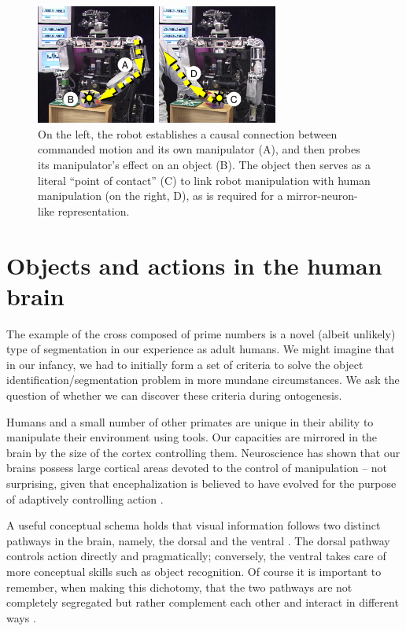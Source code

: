 %
\begin{figure}[tbh]
\begin{center}
\includegraphics[width=8cm]{tracing_causes.eps}
\caption{ 
\label{fig:tracing-causes}
%
On the left, the robot establishes a causal connection between
commanded motion and its own manipulator (A), and then probes its
manipulator's effect on an object (B).  The object then serves as a
literal ``point of contact'' (C) to link robot manipulation with human
manipulation (on the right, D), as is required for a mirror-neuron-like
representation.
%
}
\end{center}
\end{figure}
%

\section{Objects and actions in the human brain}

The example of the cross composed of prime numbers is a novel (albeit
unlikely) type of segmentation in our experience as adult humans. We
might imagine that in our infancy, we had to initially form a set of
criteria to solve the object identification/segmentation problem
in more mundane circumstances.  We ask the question of whether we can
discover these criteria during ontogenesis.

Humans and a small number of other primates are unique in their
ability to manipulate their environment using tools.
Our capacities are mirrored in the brain by the size of
the cortex controlling them.  Neuroscience has shown that our brains
possess large cortical areas devoted to the control of manipulation --
not surprising, given that encephalization is believed to have evolved
for the purpose of adaptively controlling
action \cite{maturana98tree}.

A useful conceptual schema holds that visual information follows two
distinct pathways in the brain, namely, the dorsal and the ventral
\cite{ungerleider82two,milner95visual}.
The dorsal
pathway controls action directly and pragmatically; conversely, the
ventral takes care of more conceptual skills such as object
recognition.
Of course it is important to remember, when making this dichotomy,
that the two pathways are not completely segregated but rather
complement each other and interact in different
ways \cite{jeannerod97cognitive}.

